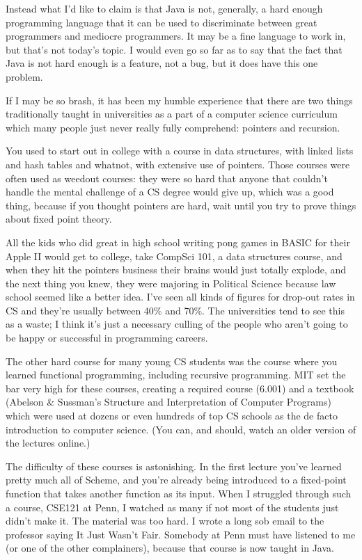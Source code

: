 \documentclass[11pt]{article}
\begin{document}
Instead what I'd like to claim is that Java is not, generally, a hard enough
programming language that it can be used to discriminate between great
programmers and mediocre programmers. It may be a fine language to work in, but
that's not today's topic. I would even go so far as to say that the fact that
Java is not hard enough is a feature, not a bug, but it does have this one
problem.

If I may be so brash, it has been my humble experience that there are two things
traditionally taught in universities as a part of a computer science curriculum
which many people just never really fully comprehend: pointers and recursion.

You used to start out in college with a course in data structures, with linked
lists and hash tables and whatnot, with extensive use of pointers. Those courses
were often used as weedout courses: they were so hard that anyone that couldn't
handle the mental challenge of a CS degree would give up, which was a good
thing, because if you thought pointers are hard, wait until you try to prove
things about fixed point theory.

All the kids who did great in high school writing pong games in BASIC for their
Apple II would get to college, take CompSci 101, a data structures course, and
when they hit the pointers business their brains would just totally explode, and
the next thing you knew, they were majoring in Political Science because law
school seemed like a better idea. I've seen all kinds of figures for drop-out
rates in CS and they're usually between 40\% and 70\%. The universities tend to
see this as a waste; I think it's just a necessary culling of the people who
aren't going to be happy or successful in programming careers.

The other hard course for many young CS students was the course where you
learned functional programming, including recursive programming. MIT set the bar
very high for these courses, creating a required course (6.001) and a textbook
(Abelson \& Sussman's Structure and Interpretation of Computer Programs) which
were used at dozens or even hundreds of top CS schools as the de facto
introduction to computer science. (You can, and should, watch an older version
of the lectures online.)

The difficulty of these courses is astonishing. In the first lecture you've
learned pretty much all of Scheme, and you're already being introduced to a
fixed-point function that takes another function as its input. When I struggled
through such a course, CSE121 at Penn, I watched as many if not most of the
students just didn't make it. The material was too hard. I wrote a long sob
email to the professor saying It Just Wasn't Fair. Somebody at Penn must have
listened to me (or one of the other complainers), because that course is now
taught in Java.
\end{document}
